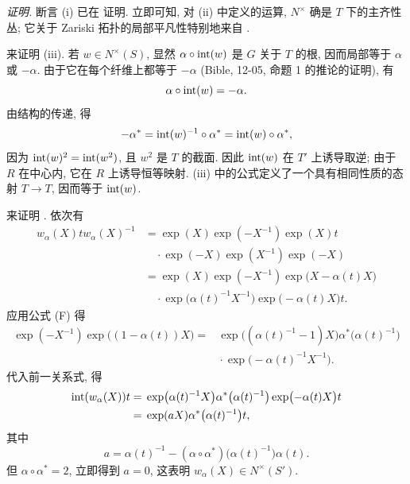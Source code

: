\noindent\emph{证明.}
断言 \textup{(i)} 已在 证明. 立即可知, 对 \textup{(ii)} 中定义的运算, \(N^\times\) 确是 \(T\) 下的主齐性丛; 它关于 Zariski 拓扑的局部平凡性特别地来自 \textup{}.

来证明 \textup{(iii)}. 若 \(w\in N^\times(S)\), 显然 \(\alpha\circ\operatorname{int}(w)\) 是 \(G\) 关于 \(T\) 的根, 因而局部等于 \(\alpha\) 或 \(-\alpha\). 由于它在每个纤维上都等于 \(-\alpha\) \textup{(Bible, 12-05, 命题 1 的推论的证明)}, 有
\[
  \alpha\circ\operatorname{int}(w)=-\alpha.
\]
由结构的传递, 得
\[
  -\alpha^\ast
    =\operatorname{int}(w)^{-1}\circ\alpha^\ast
    =\operatorname{int}(w)\circ\alpha^\ast,
\]
因为 \(\operatorname{int}(w)^2=\operatorname{int}(w^2)\), 且 \(w^2\) 是 \(T\) 的截面. 因此 \(\operatorname{int}(w)\) 在 \(T'\) 上诱导取逆; 由于 \(R\) 在中心内, 它在 \(R\) 上诱导恒等映射. \textup{(iii)} 中的公式定义了一个具有相同性质的态射 \(T\to T\), 因而等于 \(\operatorname{int}(w)\).

来证明 \textup{}. 依次有
\[
\begin{aligned}
  w_\alpha(X)t w_\alpha(X)^{-1}
    &={}\exp(X)\exp(-X^{-1})\exp(X)t\\
    &\quad{}\cdot\exp(-X)\exp(X^{-1})\exp(-X)\\
    &={}\exp(X)\exp(-X^{-1})
       \exp\bigl(X-\alpha(t)X\bigr)\\
    &\quad{}\cdot\exp\bigl(\alpha(t)^{-1}X^{-1}\bigr)
       \exp\bigl(-\alpha(t)X\bigr)t.
\end{aligned}
\]
应用公式 \textup{(F)} 得
\[
\begin{aligned}
  \exp(-X^{-1})\exp\bigl((1-\alpha(t))X\bigr)
    ={}&\exp\bigl((\alpha(t)^{-1}-1)X\bigr)
       \alpha^\ast\bigl(\alpha(t)^{-1}\bigr)\\
     &{}\cdot\exp\bigl(-\alpha(t)^{-1}X^{-1}\bigr).
\end{aligned}
\]
代入前一关系式, 得
\[
\begin{aligned}
  \operatorname{int}(w_\alpha(X))t
    &={}\exp\bigl(\alpha(t)^{-1}X\bigr)
       \alpha^\ast\bigl(\alpha(t)^{-1}\bigr)
       \exp\bigl(-\alpha(t)X\bigr)t\\
    &={}\exp(aX)\alpha^\ast\bigl(\alpha(t)^{-1}\bigr)t,
\end{aligned}
\]
其中
\[
  a=\alpha(t)^{-1}
     -(\alpha\circ\alpha^\ast)\bigl(\alpha(t)^{-1}\bigr)\alpha(t).
\]
但 \(\alpha\circ\alpha^\ast=2\), 立即得到 \(a=0\), 这表明 \(w_\alpha(X)\in N^\times(S')\).

